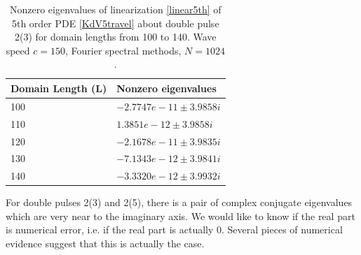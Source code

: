 \documentclass[12pt]{article}
\begin{document}
\begin{table}[H]
\begin{tabular}{l|l}
Domain Length (L)  & Nonzero eigenvalues \\ \hline
    100 &  $  -2.7747e-11 \pm 3.9858i$   \\
    110 &  $  1.3851e-12  \pm 3.9858i$   \\
    120 &  $  -2.1678e-11 \pm 3.9835i$   \\
    130 &  $ -7.1343e-12 \pm 3.9841i$   \\
    140 &  $  -3.3320e-12 \pm 3.9932i$   \\
\end{tabular}

\caption{Nonzero eigenvalues of linearization \eqref{linear5th} of 5th order PDE \eqref{KdV5travel} about double pulse 2(3) for domain lengths from 100 to 140. Wave speed $c = 150$, Fourier spectral methods, $N = 1024$.}
\end{table}

For double pulses 2(3) and 2(5), there is a pair of complex conjugate eigenvalues which are very near to the imaginary axis. We would like to know if the real part is numerical error, i.e. if the real part is actually 0. Several pieces of numerical evidence suggest that this is actually the case. 
\end{document}
